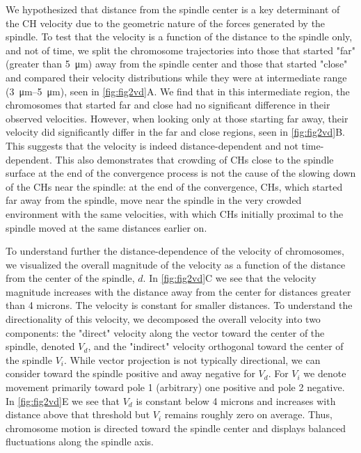 \documentclass[times, twoside,onecolumn]{zHenriquesLab-StyleBioRxiv}
\begin{document}
We hypothesized that distance from the spindle center is a key determinant of the CH velocity due to the geometric nature of the forces generated by the spindle. To test that the velocity is a function of the distance to the spindle only, and not of time, we split the chromosome trajectories into those that started "far" (greater than  \SI{5}{\um}) away from the spindle center and those that started "close" and compared their velocity distributions while they were at intermediate range (\SIrange{3}{5}{\um}), seen in \cref{fig:fig2vd}A. We find that in this intermediate region, the chromosomes that started far and close had no significant difference in their observed velocities. However, when looking only at those starting far away, their velocity did significantly differ in the far and close regions, seen in \cref{fig:fig2vd}B. This suggests that the velocity is indeed distance-dependent and not time-dependent. This also demonstrates that crowding of CHs close to the spindle surface at the end of the convergence process is not the cause of the slowing down of the CHs near the spindle: at the end of the convergence, CHs, which started far away from the spindle, move near the spindle in the very crowded environment with the same velocities, with which CHs initially proximal to the spindle moved at the same distances earlier on.

To understand further the distance-dependence of the velocity of chromosomes, we visualized the overall magnitude of the velocity as a function of the distance from the center of the spindle, $d$. In \cref{fig:fig2vd}C we see that the velocity magnitude increases with the distance away from the center for distances greater than 4 microns. The velocity is constant for smaller distances. To understand the directionality of this velocity, we decomposed the overall velocity into two components: the "direct" velocity along the vector toward the center of the spindle, denoted $V_d$, and the "indirect" velocity orthogonal toward the center of the spindle $V_i$. While vector projection is not typically directional, we can consider toward the spindle positive and away negative for $V_d$. For $V_i$ we denote movement primarily toward pole 1 (arbitrary) one positive and pole 2 negative. In \cref{fig:fig2vd}E we see that $V_d$ is constant below 4 microns and increases  with distance above that threshold but $V_i$ remains roughly zero on average. Thus, chromosome motion is directed toward the spindle center and  displays balanced fluctuations along the spindle axis. 
\end{document}

